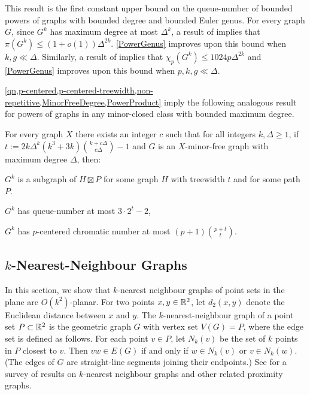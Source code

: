 \documentclass{patmorin}
\renewcommand{\le}{\leqslant}
\renewcommand{\geq}{\geqslant}
\renewcommand{\leq}{\leqslant}
\begin{document}
This result is the first constant upper bound on the queue-number of bounded powers of graphs with bounded degree and bounded Euler genus.  For every graph $G$, since $G^k$ has maximum degree at most $\Delta^k$, a result of \citet{DJKW16} implies that $\pi(G^k) \leq (1+o(1))\Delta^{2k}$. \cref{PowerGenus} improves upon this bound when $k,g\ll\Delta$.  Similarly, a result of \citet{debski.felsner.ea:improved} implies that $\chi_p(G^k)\le 1024p\Delta^{2k}$ and \cref{PowerGenus} improves upon this bound when $p,k,g\ll\Delta$.

\cref{qn,p-centered,p-centered-treewidth,non-repetitive,MinorFreeDegree,PowerProduct} imply the following analogous result for powers of graphs in any minor-closed class with bounded maximum degree. 

\begin{thm}
\label{PowerMinor}
For every graph $X$ there exists an integer $c$ such that for all integers $k,\Delta\geq 1$, if $t:= 2k\Delta^{k}(k^3+3k)\binom{k+c\Delta}{c\Delta}-1$ and $G$ is an $X$-minor-free graph with maximum degree $\Delta$, then:
\begin{compactitem}
	\item $G^k$ is a subgraph of $H\boxtimes P$ for some graph $H$ with treewidth $t$ and for some path $P$.
	\item $G^k$ has queue-number at most $3\cdot 2^t-2$, 
	\item $G^k$ has $p$-centered chromatic number at most $(p+1)\binom{p+t}{t}$. 
\end{compactitem}
\end{thm}

\subsection{$k$-Nearest-Neighbour Graphs}

In this section, we show that $k$-nearest neighbour graphs of point sets in the plane are $O(k^2)$-planar.  For two points $x,y\in\mathbb{R}^2$, let $d_2(x,y)$ denote the Euclidean distance between $x$ and $y$. The $k$-nearest-neighbour graph of a point set $P\subset\mathbb{R}^2$ is the geometric graph $G$ with vertex set $V(G)=P$, where the edge set is defined as follows. For each point $v\in P$, let $N_k(v)$ be the set of $k$ points in $P$ closest to $v$. Then $vw\in E(G)$ if and only if $w\in N_k(v)$ or $v\in N_k(w)$. (The edges of $G$ are straight-line segments joining their endpoints.) See \citep{ProximityGraphs} for a survey of results on $k$-nearest neighbour graphs and other related proximity graphs.
\end{document}
